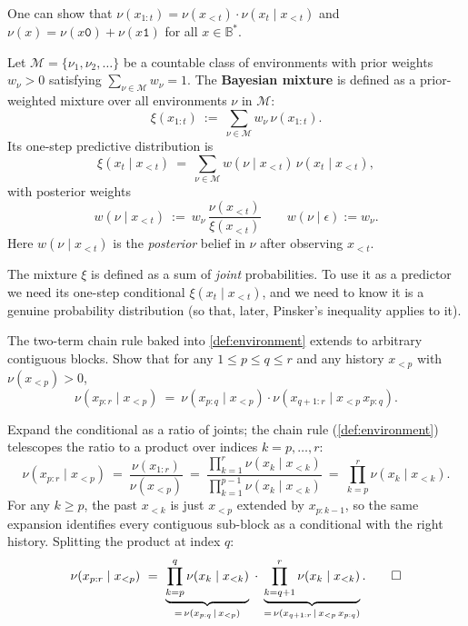 \documentclass[fontsize=11pt, parskip=half]{scrartcl}
\newcommand{\Mc}{\mathcal{M}}
\begin{document}
\begin{remark}
One can show that $\nu(x_{1:t}) = \nu(x_{<t}) \cdot \nu(x_t \mid x_{<t})$ and $\nu(x) = \nu(x\texttt{0}) + \nu(x\texttt{1})$ for all $x \in \mathbb{B}^*$. 
\end{remark}

\begin{definition}\label{def:mixture}
Let $\Mc = \{\nu_1, \nu_2, \dots\}$ be a countable class of environments with prior weights $w_\nu > 0$ satisfying $\sum_{\nu \in \Mc} w_\nu = 1$. The \textbf{Bayesian mixture} is defined as a prior-weighted mixture over all environments $\nu$ in $\Mc$:
\begin{equation}\label{eq:mixture_expression}
  \xi(x_{1:t}) ~:=~ \sum_{\nu \in \Mc} w_\nu\, \nu(x_{1:t}).
\end{equation}
Its one-step predictive distribution is
\[
  \xi(x_t \mid x_{<t}) ~=~ \sum_{\nu \in \Mc} w(\nu \mid x_{<t})\, \nu(x_t \mid x_{<t}),
\]
with posterior weights 
\[
w(\nu \mid x_{<t}) ~:=~ w_\nu\, \frac{\nu(x_{<t})}{\xi(x_{<t})}
\qquad w(\nu \mid \epsilon) := w_\nu.
\]
Here $w(\nu \mid x_{<t})$ is the \emph{posterior} belief in $\nu$ after observing $x_{<t}$.
\end{definition}

The mixture $\xi$ is defined as a sum of \emph{joint} probabilities. To use it as a predictor we need its one-step conditional $\xi(x_t \mid x_{<t})$, and we need to know it is a genuine probability distribution (so that, later, Pinsker's inequality applies to it).

\begin{exercise}
\label{prob:chain_rule_gen_ex}



The two-term chain rule baked into \cref{def:environment} extends to arbitrary contiguous blocks. Show that for any $1 \leq p \leq q \leq r$ and any history $x_{<p}$ with $\nu(x_{<p}) > 0$,
\[
  \nu(x_{p:r} \mid x_{<p}) ~=~ \nu(x_{p:q} \mid x_{<p}) \cdot \nu(x_{q+1:r} \mid x_{<p}\, x_{p:q}).
\]
\end{exercise}

\begin{solution}
Expand the conditional as a ratio of joints; the chain rule (\cref{def:environment}) telescopes the ratio to a product over indices $k = p, \ldots, r$:
\[
  \nu(x_{p:r} \mid x_{<p})
  ~=~ \frac{\nu(x_{1:r})}{\nu(x_{<p})}
  ~=~ \frac{\prod_{k=1}^{r} \nu(x_k \mid x_{<k})}{\prod_{k=1}^{p-1} \nu(x_k \mid x_{<k})}
  ~=~ \prod_{k=p}^{r} \nu(x_k \mid x_{<k}).
\]
For any $k \geq p$, the past $x_{<k}$ is just $x_{<p}$ extended by $x_{p:k-1}$, so the same expansion identifies every contiguous sub-block as a conditional with the right history. Splitting the product at index $q$:
\[
  \nu(x_{p:r} \mid x_{<p})
  ~=~ \underbrace{\prod_{k=p}^{q} \nu(x_k \mid x_{<k})}_{=\,\nu(x_{p:q}\,\mid\,x_{<p})}
  \;\cdot\; \underbrace{\prod_{k=q+1}^{r} \nu(x_k \mid x_{<k})}_{=\,\nu(x_{q+1:r}\,\mid\,x_{<p}\, x_{p:q})}. \qedhere
\]
\end{solution}
\end{document}
